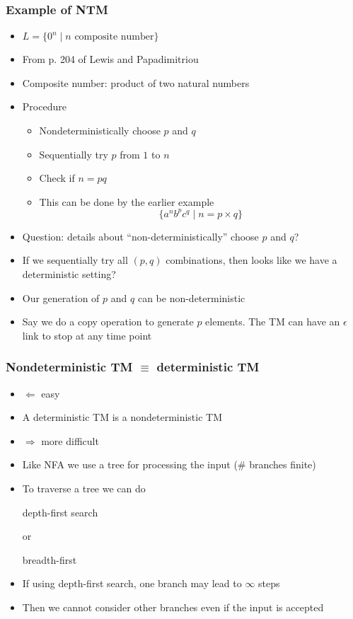 \begin{frame}[allowframebreaks]
\begin{itemize}
\end{itemize}\end{frame} \begin{frame}[allowframebreaks] \frametitle{Example of NTM}
  \begin{itemize}
\item $L=\{0^n\mid n \mbox{ composite number}\}$
\item From p. 204 of Lewis and Papadimitriou
\item Composite number: product of two natural numbers
\item Procedure
  \begin{itemize}
  \item Nondeterministically choose $p$ and $q$

  \item [] Sequentially try $p$ from $1$ to $n$

  \item Check if $n=pq$

  \item [] This can be done by the earlier example
    \begin{equation*}
    \{a^n b^p c^q\mid n = p \times q\}
  \end{equation*}
  \end{itemize}
\item Question: details about ``non-deterministically'' choose $p$ and $q$?
\item If we sequentially try all $(p,q)$ combinations, then
  looks like we have a deterministic setting?
  
\item Our generation of  $p$ and $q$ can be non-deterministic
\item Say we do a copy operation to generate $p$ elements. The TM can
  have an $\epsilon$ link to stop at any time point
\end{itemize}\end{frame} \begin{frame}[allowframebreaks] \frametitle{Nondeterministic TM $
\equiv$ deterministic TM}
  \begin{itemize}
\item 
$\Leftarrow$ easy
\item
  [] A deterministic TM is a nondeterministic TM

\item
  $\Rightarrow$ more difficult
\item
  Like NFA we use a tree for processing the input
(\# branches finite)
\item
  To traverse a tree we can do
  \begin{center}
  depth-first search
\end{center}
  or
  \begin{center}
  breadth-first
\end{center}
\item If using depth-first search, one branch 
may lead to $\infty$ steps
\item [] Then we cannot consider other branches even if the
  input is accepted


\end{itemize}
\end{frame}
